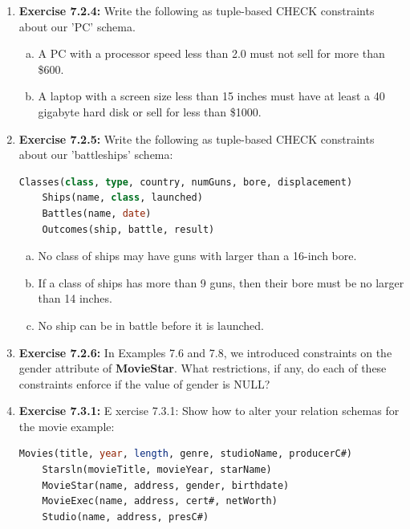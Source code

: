 \documentclass[12pt]{article}
\begin{document}
\begin{enumerate}[1.]
    \item \textbf{Exercise 7.2.4:} Write the following as tuple-based CHECK constraints about
    our 'PC' schema.

    \bigskip

    \begin{enumerate}[a)]
        \item A PC with a processor speed less than 2.0 must not sell for more than \$600.
        \item A laptop with a screen size less than 15 inches must have at least a 40 gigabyte hard disk or sell for less than \$1000.
    \end{enumerate}

    \item \textbf{Exercise 7.2.5:} Write the following as tuple-based CHECK constraints about
    our 'battleships' schema:

    \bigskip

    \begin{lstlisting}[language=SQL]
    Classes(class, type, country, numGuns, bore, displacement)
    Ships(name, class, launched)
    Battles(name, date)
    Outcomes(ship, battle, result)
    \end{lstlisting}

    \begin{enumerate}[a)]
        \item No class of ships may have guns with larger than a 16-inch bore.
        \item If a class of ships has more than 9 guns, then their bore must be no larger than 14 inches.
        \item No ship can be in battle before it is launched.
    \end{enumerate}

    \item \textbf{Exercise 7.2.6:} In Examples 7.6 and 7.8, we introduced constraints on the
    gender attribute of \textbf{MovieStar}. What restrictions, if any, do each of these constraints
    enforce if the value of gender is NULL?

    \item \textbf{Exercise 7.3.1:} E xercise 7.3.1: Show how to alter your relation
    schemas for the movie example:

    \bigskip

    \begin{lstlisting}[language=SQL]
    Movies(title, year, length, genre, studioName, producerC#)
    Starsln(movieTitle, movieYear, starName)
    MovieStar(name, address, gender, birthdate)
    MovieExec(name, address, cert#, netWorth)
    Studio(name, address, presC#)
    \end{lstlisting}


\end{enumerate}
\end{document}
